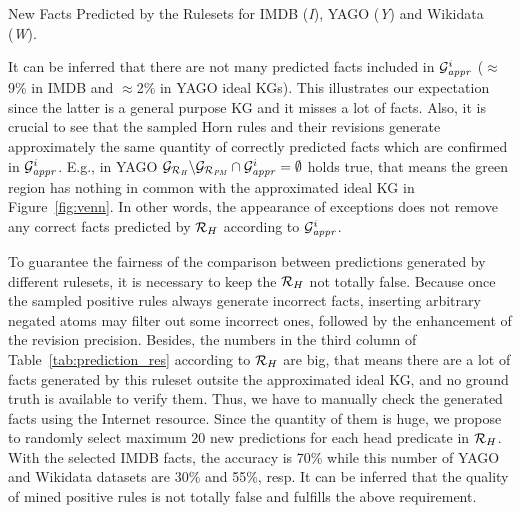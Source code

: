 \begin{table}[ht]
\centering

\smallskip
\caption{New Facts Predicted by the Rulesets for IMDB (\textit{I}), YAGO (\textit{Y}) and Wikidata (\textit{W}).}
\label{tab:prediction_res}
\end{table}

It can be inferred that there are not many predicted facts included in $\mathcal{G}^i_{\mathit{appr}}$ ($\approx$9\% in IMDB and $\approx$2\% in YAGO ideal KGs). This illustrates our expectation since the latter is a general purpose KG and it misses a lot of facts. Also, it is crucial to see that the sampled Horn rules and their revisions generate approximately the same quantity of correctly predicted facts which are confirmed in $\mathcal{G}^i_{\mathit{appr}}$. E.g., in YAGO $\mathcal{G}_{\mathit{\mathcal{R}_H}}\backslash \mathcal{G}_{\mathit{\mathcal{R}_{PM}}} \cap \mathcal{G}^i_{\mathit{appr}}=\emptyset$ holds true, that means the green region has nothing in common with the approximated ideal KG in Figure~\ref{fig:venn}. In other words, the appearance of exceptions does not remove any correct facts predicted by $\mathcal{R}_H$ according to $\mathcal{G}^i_{\mathit{appr}}$.

To guarantee the fairness of the comparison between predictions generated by different rulesets, it is necessary to keep the $\mathcal{R}_H$ not totally false. Because once the sampled positive rules always generate incorrect facts, inserting arbitrary negated atoms may filter out some incorrect ones, followed by the enhancement of the revision precision. Besides, the numbers in the third column of Table~\ref{tab:prediction_res} according to $\mathcal{R}_H$ are big, that means there are a lot of facts generated by this ruleset outsite the approximated ideal KG, and no ground truth is available to verify them. Thus, we have to manually check the generated facts using the Internet resource. Since the quantity of them is huge, we propose to randomly select maximum 20 new predictions for each head predicate in $\mathcal{R}_H$. With the selected IMDB facts, the accuracy is 70\% while this number of YAGO and Wikidata datasets are 30\% and 55\%, resp. It can be inferred that the quality of mined positive rules is not totally false and fulfills the above requirement.

